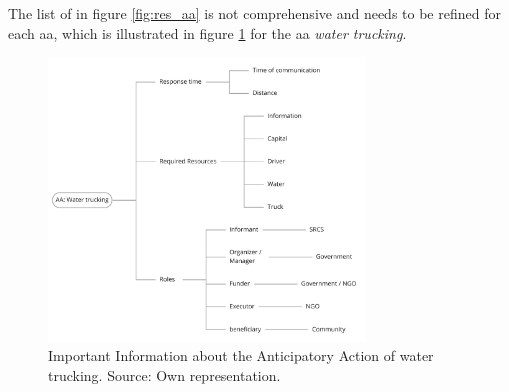 The list of in figure \ref{fig:res_aa} is not comprehensive and needs to be refined for each \acrshort{aa}, which is illustrated in figure \ref{fig:res_water_truck} for the \acrshort{aa} \textit{water trucking}.

\begin{figure}[!h]
    \centering
    \includegraphics[width=0.75\textwidth]{figures/2023_MA_results_trucking.pdf}
    \decoRule
    \caption[Water Trucking parameters]{Important Information about the Anticipatory Action of water trucking. Source: Own representation.}
    \label{fig:res_water_truck}
\end{figure}

